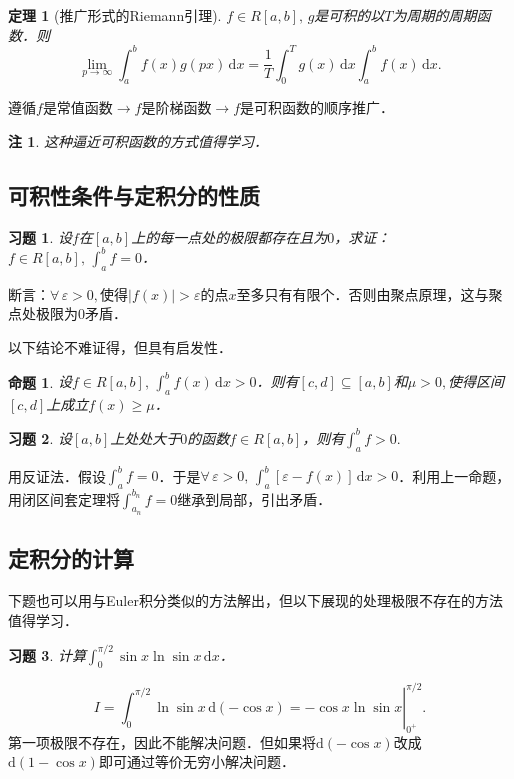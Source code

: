 \documentclass[11pt,a4paper]{ctexart}
\makeatletter
\theoremstyle{thmseries} %
\newtheorem{thm}{定理}[section]
\newtheorem{prop}{命题}[section]
\theoremstyle{exerseries}
\newtheorem{exer}{习题}[section]
\newtheorem*{rem}{注}
\renewenvironment{proof}[1][\proofname]{\par
  \pushQED{\qed}%
  \normalfont \topsep6\p@\@plus6\p@\relax
  \trivlist
  \item[\hskip\labelsep
        \itshape
    #1\@addpunct{}]\ignorespaces
}{%
  \popQED\endtrivlist\@endpefalse
}
\newenvironment{sol}{\begin{proof}[\bfseries\upshape 解\quad]}{\end{proof}}
\newenvironment{pf}{\begin{proof}[\bfseries\upshape 证\quad]}{\end{proof}}
\renewcommand{\epsilon}{\varepsilon}
\renewcommand{\d}{\mathrm{d}}
\makeatother
\begin{document}
\begin{thm}[推广形式的Riemann引理]
	$f\in R[a,b],\,g$是可积的以$T$为周期的周期函数．则
	\[\lim_{p\to\infty}\int_{a}^{b}f(x)g(px)\,\d x=\frac{1}{T}\int_{0}^{T}g(x)\,\d x\int_{a}^{b}f(x)\,\d x.\]
\end{thm}
\begin{pf}
	遵循$f$是常值函数$\to f$是阶梯函数$\to f$是可积函数的顺序推广．
\end{pf}
\begin{rem}
	这种逼近可积函数的方式值得学习．
\end{rem}


\subsection{可积性条件与定积分的性质}
\begin{exer}
	设$f$在$[a,b]$上的每一点处的极限都存在且为$0$，求证：$f\in R[a,b],\,\int_{a}^{b}f=0$．
\end{exer}
\begin{pf}
	断言：$\forall\,\epsilon>0,$使得$|f(x)|>\epsilon$的点$x$至多只有有限个．否则由聚点原理，这与聚点处极限为0矛盾．
\end{pf}

以下结论不难证得，但具有启发性．
\begin{prop}
	设$f\in R[a,b],\,\int_{a}^{b}f(x)\,\d x>0$．则有$[c,d]\subseteq[a,b]$和$\mu>0,$使得区间$[c,d]$上成立$f(x)\geq\mu$．
\end{prop}

\begin{exer}
	设$[a,b]$上处处大于$0$的函数$f\in R[a,b]$，则有$\int_{a}^{b}f>0.$
\end{exer}
\begin{pf}
	用反证法．假设$\int_{a}^{b}f=0$．于是$\forall\,\epsilon>0,\,\int_{a}^{b}[\epsilon-f(x)]\,\d x>0$．利用上一命题，用闭区间套定理将$\int_{a_n}^{b_n}f=0$继承到局部，引出矛盾．
\end{pf}


\subsection{定积分的计算}
下题也可以用与Euler积分类似的方法解出，但以下展现的处理极限不存在的方法值得学习．
\begin{exer}
	计算$\int_{0}^{\pi/2}\sin x\ln\sin x\,\d x$．
\end{exer}
\begin{sol}
	\[\left.I=\int_{0}^{\pi/2}\ln\sin x\,\d(-\cos x)=-\cos x\ln\sin x\right|_{0^+}^{\pi/2}.\]
	第一项极限不存在，因此不能解决问题．但如果将$\d(-\cos x)$改成$\d(1-\cos x)$即可通过等价无穷小解决问题．
\end{sol}
\end{document}
